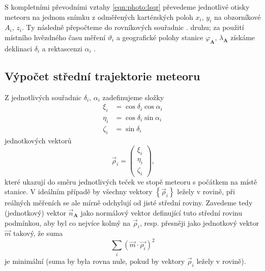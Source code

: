 S kompletními převodními vztahy \eqref{eqn:photo:lsqr} převedeme jednotlivé otisky meteoru na jednom snímku z odměřených kartézských poloh $x_i,\,y_i$ na obzorníkové $A_i,\,z_i$. Ty následně přepočteme do rovníkových souřadnic {\uppercase\expandafter{\relax}}. druhu; za použití místního hvězdného času měření $\vartheta_i$ a geografické polohy stanice $\varphi_\mathbf{A},\,\lambda_\mathbf{A}$ získáme deklinaci $\delta_i$ a rektascenzi $\alpha_i$ \cite{ceplecha}.

\subsection{Výpočet střední trajektorie meteoru}%
Z jednotlivých souřadnic $\delta_i,\,\alpha_i$ zadefinujeme složky
\begin{equation}
    \begin{aligned}
        \xi_i   & =\cos{\delta_i}\cos{\alpha_i} \\
        \eta_i  & =\cos{\delta_i}\sin{\alpha_i} \\
        \zeta_i & =\sin{\delta_i}
    \end{aligned}
\end{equation}
jednotkových vektorů
$$
    \vec{\rho}_i=\begin{pmatrix}
        \xi_i \\\eta_i\\\zeta_i
    \end{pmatrix}\text{,}
$$
které ukazují do směru jednotlivých teček ve stopě meteoru s počátkem na místě stanice. V ideálním případě by všechny vektory $\left\{\vec{\rho}_i\right\}$ ležely v rovině, při reálných měřeních se ale mírně odchylují od jisté střední roviny. Zavedeme tedy (jednotkový) vektor $\vec{n}_\mathbf{A}$ jako normálový vektor definující tuto střední rovinu podmínkou, aby byl co nejvíce kolmý na $\vec{\rho}_i$, resp. přesněji jako jednotkový vektor $\vec{m}$ takový, že suma
$$
    \sum_{i}{\left( \vec{m}\cdot\vec{\rho_i} \right)^2}
$$
je minimální \cite{ceplecha} (suma by byla rovna nule, pokud by vektory $\vec{\rho}_i$ ležely v rovině).

